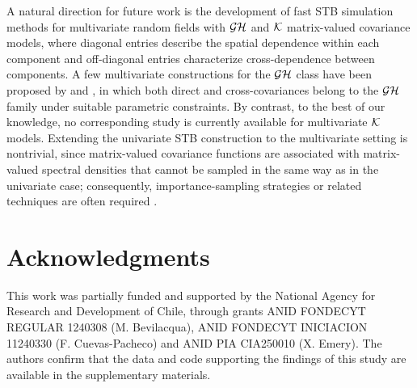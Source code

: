 \documentclass[
  12pt]{article}
\begin{document}
A natural direction for future work is the development of fast STB simulation methods for multivariate random fields with ${\cal GH}$ and ${\cal K}$ matrix-valued covariance models, where diagonal entries describe the spatial dependence within each component and off-diagonal entries characterize cross-dependence between components. A few multivariate constructions for the ${\cal GH}$ class have been proposed by \cite{daley2015} and \cite{emery2022gauss}, in which both direct and cross-covariances belong to the ${\cal GH}$ family under suitable parametric constraints. By contrast, to the best of our knowledge, no corresponding study is currently available for multivariate ${\cal K}$ models. Extending the univariate STB construction to the multivariate setting is nontrivial, since matrix-valued covariance functions are associated with matrix-valued spectral densities that cannot be sampled in the same way as in the univariate case; consequently, importance-sampling strategies or related techniques are often required \citep{emery2016}.



\section*{Acknowledgments}

This work was partially funded and supported by the National Agency for Research and Development of Chile, through grants ANID FONDECYT REGULAR 1240308 (M. Bevilacqua), ANID FONDECYT INICIACION 11240330 (F. Cuevas-Pacheco) and ANID PIA CIA250010 (X. Emery).
The authors confirm that the data and code  supporting the findings of this study are available in the supplementary materials.

\newpage

%


%
\end{document}
